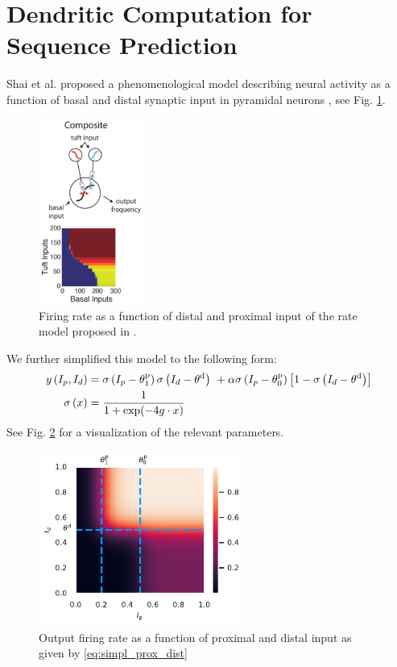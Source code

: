 \documentclass[10pt,a4paper]{article}
\begin{document}
\section{Dendritic Computation for Sequence Prediction}


Shai et al. proposed a phenomenological model describing neural activity as a function of basal and distal synaptic input in pyramidal neurons \cite{Shai_2015}, see Fig. \ref{fig:Shai_prox_dist}.
\begin{figure}
\centering
\includegraphics[width=0.3\textwidth]{./figures/shai_phen_model.png}
\caption{Firing rate as a function of distal and proximal input of the rate model proposed in \cite{Shai_2015}.}
\label{fig:Shai_prox_dist}
\end{figure}
We further simplified this model to the following form:
\begin{align}
y\left(I_p,I_d\right) &= \sigma\left(I_p-\theta^{\rm p}_{1}\right) \sigma\left(I_d-\theta^{\rm d}\right)\ +\alpha\sigma\left(I_p-\theta^{\rm p}_{0}\right)\left[ 1 - \sigma\left(I_d-\theta^{\rm d}\right)\right] \label{eq:simpl_prox_dist} \\
\sigma\left(x\right) &= \frac{1}{1+\exp(-4 g\cdot x)} \label{eq:sigmoidal}
\end{align}
See Fig. \ref{fig:simpl_prox_dist} for a visualization of the relevant parameters.

\begin{figure}
\centering
\includegraphics[width=0.6\textwidth]{./figures/plot_comp_mod_marks.pdf}
\caption{Output firing rate as a function of proximal and distal input as given by \eqref{eq:simpl_prox_dist}}
\label{fig:simpl_prox_dist}
\end{figure}
\end{document}
